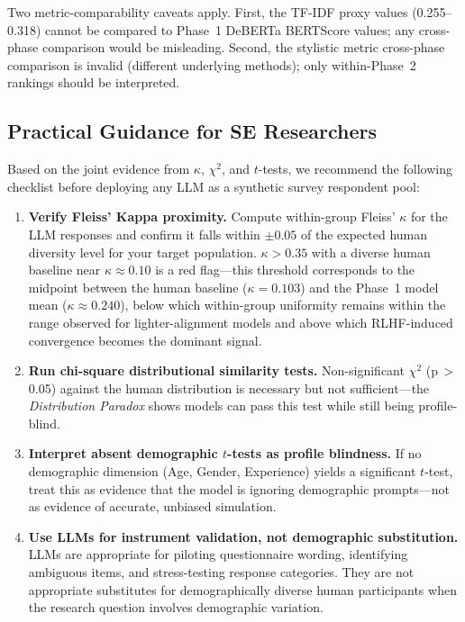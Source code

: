 \documentclass[sigconf,nonacm]{acmart}
\newcommand{\distrpar}{\textit{Distribution Paradox}\xspace}
\begin{document}
Two metric-comparability caveats apply.
First, the TF-IDF proxy values (0.255--0.318) cannot be compared to
Phase~1 DeBERTa BERTScore values; any cross-phase comparison would be
misleading.
Second, the stylistic metric cross-phase comparison is invalid
(different underlying methods); only within-Phase~2 rankings
should be interpreted.

\subsection{Practical Guidance for SE Researchers}
\label{sec:disc:guidance}

Based on the joint evidence from $\kappa$, $\chi^2$, and $t$-tests, we
recommend the following checklist before deploying any LLM as a synthetic
survey respondent pool:

\begin{enumerate}[leftmargin=1.4em,itemsep=2pt]
\item \textbf{Verify Fleiss' Kappa proximity.}
  Compute within-group Fleiss' $\kappa$ for the LLM responses and confirm
  it falls within $\pm 0.05$ of the expected human diversity level for
  your target population.
  $\kappa > 0.35$ with a diverse human baseline near $\kappa{\approx}0.10$
  is a red flag---this threshold corresponds to the midpoint between the
  human baseline ($\kappa{=}0.103$) and the Phase~1 model mean
  ($\kappa{\approx}0.240$), below which within-group uniformity remains
  within the range observed for lighter-alignment models and above which
  RLHF-induced convergence becomes the dominant signal.
\item \textbf{Run chi-square distributional similarity tests.}
  Non-significant $\chi^2$ (p\,$>$\,0.05) against the human distribution
  is necessary but not sufficient---the \distrpar shows models can pass this
  test while still being profile-blind.
\item \textbf{Interpret absent demographic $t$-tests as profile blindness.}
  If no demographic dimension (Age, Gender, Experience) yields a significant
  $t$-test, treat this as evidence that the model is ignoring demographic
  prompts---not as evidence of accurate, unbiased simulation.
\item \textbf{Use LLMs for instrument validation, not demographic substitution.}
  LLMs are appropriate for piloting questionnaire wording, identifying
  ambiguous items, and stress-testing response categories.
  They are not appropriate substitutes for demographically diverse human
  participants when the research question involves demographic variation.
\end{enumerate}
\end{document}
